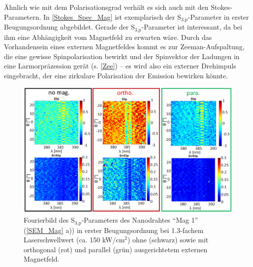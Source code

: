 Ähnlich wie mit dem Polarisationsgrad verhält es sich auch mit den Stokes-Parametern. In \autoref{Stokes_Spec_Mag} ist exemplarisch der S$_\text{3,p}$-Parameter in erster Beugungsordnung abgebildet. Gerade der S$_\text{3,p}$-Parameter ist interessant, da bei ihm eine Abhängigkeit vom Magnetfeld zu erwarten wäre. Durch das Vorhandensein eines externen Magnetfeldes kommt es zur Zeeman-Aufspaltung, die eine gewisse Spinpolarisation bewirkt und der Spinvektor der Ladungen in eine Larmorpräzession gerät (s. \autoref{Zee}) – es wird also ein externer Drehimpuls eingebracht, der eine zirkulare Polarisation der Emission bewirken könnte.\begin{figure}[h]
\centering
\includegraphics[width=.85\textwidth]{Bilder/Mag/Stokes_Spec_Mag}
\caption{Fourierbild des S$_\text{3,p}$-Parameters des Nanodrahtes ``Mag 1'' (\autoref{SEM_Mag} a)) in erster Beugungsordnung bei 1.3-fachem Laserschwellwert (ca. 150 kW/cm$^\text{2}$) ohne (schwarz) sowie mit orthogonal (rot) und parallel (grün) ausgerichtetem externen Magnetfeld.}
\label{Stokes_Spec_Mag}
\centering
\end{figure}
